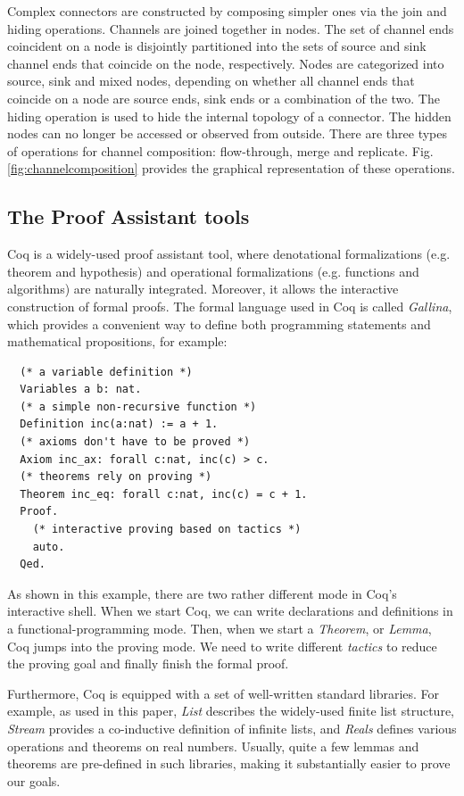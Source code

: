 \documentclass{llncs}
\begin{document}
Complex connectors are constructed by composing simpler ones via the join and hiding operations. Channels are joined together in nodes. The set of channel ends coincident on a node is disjointly partitioned into the sets of source and sink channel ends that coincide on the node, respectively. Nodes are categorized into source, sink and mixed nodes, depending on whether all channel ends that coincide on a node are source ends, sink ends or a combination of the two. The hiding operation is used to hide the internal topology of a connector. The hidden nodes can no longer be accessed or observed from outside. There are three types of operations for channel composition: flow-through, merge and replicate. Fig. \ref{fig:channelcomposition} provides the graphical representation of these operations.

\subsection{The Proof Assistant tools}

Coq\cite{huet1997coq} is a widely-used proof assistant tool, where denotational formalizations (e.g.
theorem and hypothesis) and operational formalizations (e.g. functions and algorithms) are naturally
integrated. Moreover, it allows the interactive construction of formal proofs.
The formal language used in Coq is called \emph{Gallina}, which provides a convenient way to define
both programming statements and mathematical propositions, for example:
\begin{verbatim}
  (* a variable definition *)
  Variables a b: nat.
  (* a simple non-recursive function *)
  Definition inc(a:nat) := a + 1.
  (* axioms don't have to be proved *)
  Axiom inc_ax: forall c:nat, inc(c) > c.
  (* theorems rely on proving *)
  Theorem inc_eq: forall c:nat, inc(c) = c + 1.
  Proof.
    (* interactive proving based on tactics *)
    auto.
  Qed.
\end{verbatim}

As shown in this example, there are two rather different mode in Coq's interactive shell. When
we start Coq, we can write declarations and definitions in a functional-programming mode. Then, when
we start a \emph{Theorem}, or \emph{Lemma}, Coq jumps into the proving mode. We need to write
different \emph{tactics} to reduce the proving goal and finally finish the formal proof.

Furthermore, Coq is equipped with a set of well-written standard libraries. For example, as used in
this paper, \emph{List} describes the widely-used finite list structure, \emph{Stream} provides a co-inductive
definition of infinite lists, and \emph{Reals} defines various operations and theorems on real
numbers. Usually, quite a few lemmas and theorems are pre-defined in such libraries, making it
substantially easier to prove our goals.
\end{document}
